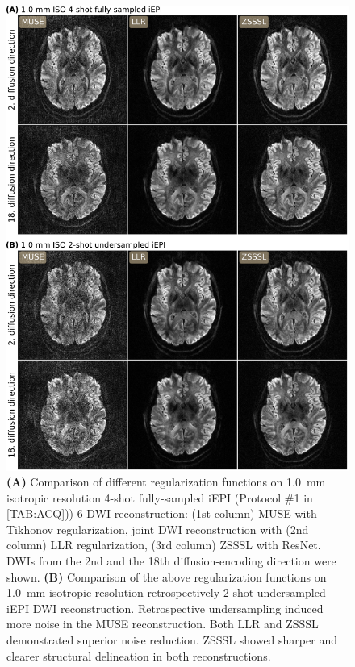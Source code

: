 \documentclass[journal,twoside,web]{ieeecolor}
\begin{document}
	\begin{figure}
		\begin{minipage}[c]{0.75\textwidth}
			\includegraphics[width=\textwidth]{../figures/fig2.png}
		\end{minipage}\hfill
		\begin{minipage}[c]{0.23\textwidth}
			\caption{\textbf{(A)} Comparison of different regularization functions
				on \SI{1.0}{mm} isotropic resolution 4-shot fully-sampled iEPI
				(Protocol \#1 in \cref{TAB:ACQ})) 6
				DWI reconstruction:
				(1st column) MUSE with Tikhonov regularization,
				joint DWI reconstruction with
				(2nd column) LLR regularization,
				(3rd column) ZSSSL with ResNet.
				DWIs from the 2nd and the 18th diffusion-encoding direction were shown.
				\textbf{(B)} Comparison of the above regularization functions
				on \SI{1.0}{mm} isotropic resolution
				retrospectively 2-shot undersampled iEPI DWI reconstruction.
				Retrospective undersampling induced more noise in the MUSE reconstruction.
				Both LLR and ZSSSL demonstrated superior noise reduction.
				ZSSSL showed sharper and clearer structural delineation
				in both reconstructions.}
				\label{FIG:REGU}
		\end{minipage}
	\end{figure}
\end{document}
